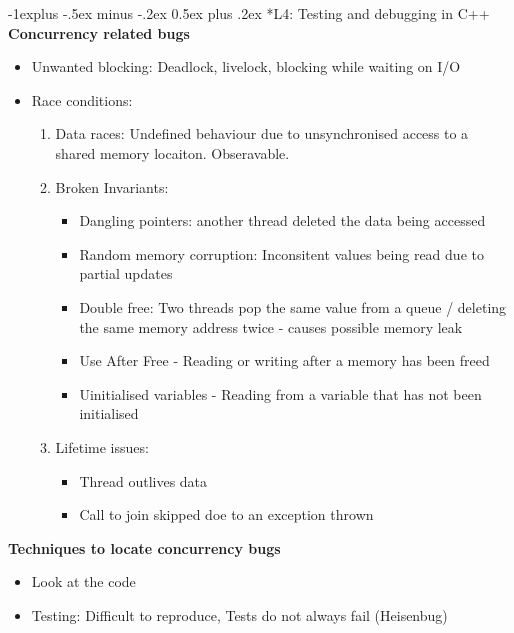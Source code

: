 \documentclass[10pt, landscape]{article}
\makeatletter
\renewcommand{\subsection}{\@startsection{subsection}{2}{0mm}%
                                {-1explus -.5ex minus -.2ex}%
                                {0.5ex plus .2ex}%
                                {\normalfont\normalsize\bfseries}}
\makeatother
\begin{document}
\begin{multicols}{4}
\subsection*{L4: Testing and debugging in C++} 
\textbf{Concurrency related bugs}\\
\begin{itemize}
    \item Unwanted blocking: Deadlock, livelock, blocking while waiting on I/O
    \item Race conditions:  
    \begin{enumerate}
        \item Data races: Undefined behaviour due to unsynchronised access to a shared memory locaiton. Obseravable.
        \item Broken Invariants:
        \begin{itemize}
            \item Dangling pointers: another thread deleted the data being accessed
            \item Random memory corruption: Inconsitent values being read due to partial updates
            \item Double free: Two threads pop the same value from a queue / deleting the same memory address twice - causes possible memory leak
            \item Use After Free - Reading or writing after a memory has been freed
            \item Uinitialised variables - Reading from a variable that has not been initialised
        \end{itemize}
        \item Lifetime issues:
        \begin{itemize}
            \item Thread outlives data
            \item Call to join skipped doe to an exception thrown
        \end{itemize}
    \end{enumerate}
\end{itemize}

\textbf{Techniques to locate concurrency bugs} \\ 
\begin{itemize}
    \item Look at the code 
    \item Testing: Difficult to reproduce, Tests do not always fail (Heisenbug)
\end{itemize}


\end{multicols}
\end{document}
